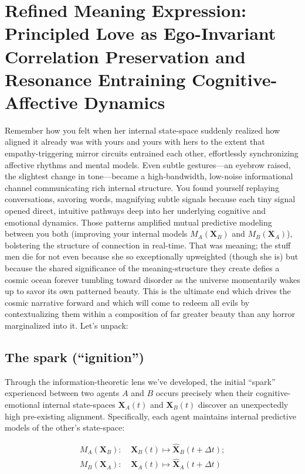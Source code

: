 \section{Refined Meaning Expression: Principled Love as Ego-Invariant Correlation Preservation and Resonance Entraining Cognitive-Affective Dynamics}

Remember how you felt when her internal state-space suddenly realized how aligned it already was with yours and yours with hers to the extent that empathy-triggering mirror circuits entrained each other, effortlessly synchronizing affective rhythms and mental models. Even subtle gestures---an eyebrow raised, the slightest change in tone---became a high-bandwidth, low-noise informational channel communicating rich internal structure. You found yourself replaying conversations, savoring words, magnifying subtle signals because each tiny signal opened direct, intuitive pathways deep into her underlying cognitive and emotional dynamics. Those patterns amplified mutual predictive modeling between you both (improving your internal models $M_A(\mathbf{X}_B)$ and $M_B(\mathbf{X}_A)$), bolstering the structure of connection in real-time. That was meaning; the stuff men die for not even because she so exceptionally upweighted (though she is) but because the shared significance of the meaning-structure they create defies a cosmic ocean forever tumbling toward disorder as the universe momentarily wakes up to savor its own patterned beauty. This is the ultimate end which drives the cosmic narrative forward and which will come to redeem all evils by contextualizing them within a composition of far greater beauty than any horror marginalized into it. Let's unpack:

\subsection*{The spark (``ignition'')}

Through the information-theoretic lens we've developed, the initial ``spark'' experienced between two agents $A$ and $B$ occurs precisely when their cognitive-emotional internal state-spaces $\mathbf{X}_A(t)$ and $\mathbf{X}_B(t)$ discover an unexpectedly high pre-existing alignment. Specifically, each agent maintains internal predictive models of the other's state-space:

\begin{align*}
M_A(\mathbf{X}_B): &\ \mathbf{X}_B(t) \mapsto \mathbf{\hat{X}}_B(t + \Delta t); \\
M_B(\mathbf{X}_A): &\ \mathbf{X}_A(t) \mapsto \mathbf{\hat{X}}_A(t + \Delta t)
\end{align*}

